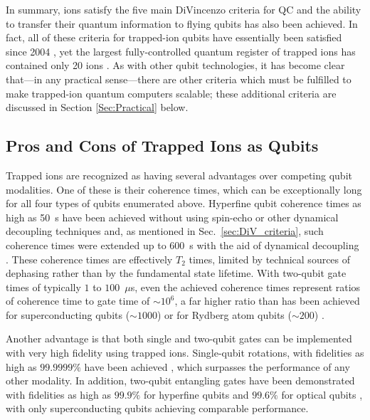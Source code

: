 \documentclass[%
reprint,
 amsmath,amssymb,
]{revtex4-1}
\begin{document}
In summary, ions satisfy the five main DiVincenzo criteria for QC and the ability to transfer their quantum information to flying qubits has also been achieved. In fact, all of these criteria for trapped-ion qubits have essentially been satisfied since 2004 \cite{LeibfriedDidiGate2003,BlinovIonPhotonEntangle2004}, yet the largest fully-controlled quantum register of trapped ions has contained only 20 ions \cite{Friis20QubitEntanglement2018}. As with other qubit technologies, it has become clear that---in any practical sense---there are other criteria which must be fulfilled to make trapped-ion quantum computers scalable; these additional criteria are discussed in Section \ref{Sec:Practical} below.


\subsection{Pros and Cons of Trapped Ions as Qubits}
\label{ProsandCons}

Trapped ions are recognized as having several advantages over competing qubit modalities. One of these is their coherence times, which can be exceptionally long for all four types of qubits enumerated above. Hyperfine qubit coherence times as high as 50~s have been achieved without using spin-echo or other dynamical decoupling techniques \cite{PhysRevLett.113.220501} and, as mentioned in Sec.~\ref{sec:DiV_criteria}, such coherence times were extended up to 600~s with the aid of dynamical decoupling \cite{bollinger_IEEE_550s_ramsey,Wang10MinuteCoherence2017}. These coherence times are effectively $T_2$ times, limited by technical sources of dephasing rather than by the fundamental state lifetime. With two-qubit gate times of typically $1$ to $100$~$\mu$s, even the achieved coherence times represent ratios of coherence time to gate time of ${\sim}10^6$, a far higher ratio than has been achieved for superconducting qubits (${\sim}1000$) \cite{BarendsSCQubitgate2014} or for Rydberg atom qubits (${\sim}200$) \cite{LevineRydbergGate2018}.

Another advantage is that both single and two-qubit gates can be implemented with very high fidelity using trapped ions. Single-qubit rotations, with fidelities as high as $99.9999 \%$ have been achieved \cite{HartyHighFidelityIons2014}, which surpasses the performance of any other modality. In addition, two-qubit entangling gates have been demonstrated with fidelities as high as $99.9 \%$ for hyperfine qubits \cite{Ballance2QubitHyperfineGate2016, nist_gate_2016} and $99.6 \%$ for optical qubits \cite{ErhardBlattCycleBench2019}, with only superconducting qubits achieving comparable performance.
\end{document}
